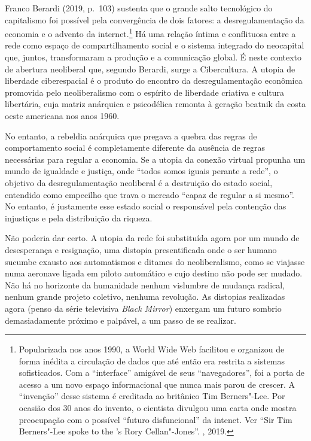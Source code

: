 Franco Berardi (2019, p.~103) sustenta que o grande salto tecnológico do
capitalismo foi possível pela convergência de dois fatores: a
desregulamentação da economia e o advento da internet.\footnote{Popularizada
  nos anos 1990, a World Wide Web facilitou e organizou de forma inédita
  a circulação de dados que até então era restrita a sistemas
  sofisticados. Com a ``interface'' amigável de seus ``navegadores'',
  foi a porta de acesso a um novo espaço informacional que nunca mais
  parou de crescer. A ``invenção'' desse sistema é creditada ao
  britânico Tim Berners"-Lee. Por ocasião dos 30 anos do invento, o
  cientista divulgou uma carta onde mostra preocupação com o possível
  ``futuro disfuncional'' da intenet. Ver ``Sir Tim Berners"-Lee spoke to
  the 's Rory Cellan"-Jones''. , 2019.} Há uma relação íntima e
conflituosa entre a rede como espaço de compartilhamento social e o
sistema integrado do neocapital que, juntos, transformaram a produção e
a comunicação global. É neste contexto de abertura neoliberal que,
segundo Berardi, surge a Cibercultura. A utopia de liberdade
ciberespacial é o produto do encontro da desregulamentação econômica
promovida pelo neoliberalismo com o espírito de liberdade criativa e
cultura libertária, cuja matriz anárquica e psicodélica remonta à
geração beatnik da costa oeste americana nos anos 1960.

No entanto, a rebeldia anárquica que pregava a quebra das regras de
comportamento social é completamente diferente da ausência de regras
necessárias para regular a economia. Se a utopia da conexão virtual
propunha um mundo de igualdade e justiça, onde ``todos somos iguais
perante a rede'', o objetivo da desregulamentação neoliberal é a
destruição do estado social, entendido como empecilho que trava o
mercado ``capaz de regular a si mesmo''. No entanto, é justamente esse
estado social o responsável pela contenção das injustiças e pela
distribuição da riqueza.

Não poderia dar certo. A utopia da rede foi substituída agora por um
mundo de desesperança e resignação, uma distopia presentificada onde o
ser humano sucumbe exausto aos automatismos e ditames do neoliberalismo,
como se viajasse numa aeronave ligada em piloto automático e cujo
destino não pode ser mudado. Não há no horizonte da humanidade nenhum
vislumbre de mudança radical, nenhum grande projeto coletivo, nenhuma
revolução. As distopias realizadas agora (penso da série televisiva
\emph{Black Mirror}) enxergam um futuro sombrio demasiadamente próximo e
palpável, a um passo de se realizar.

